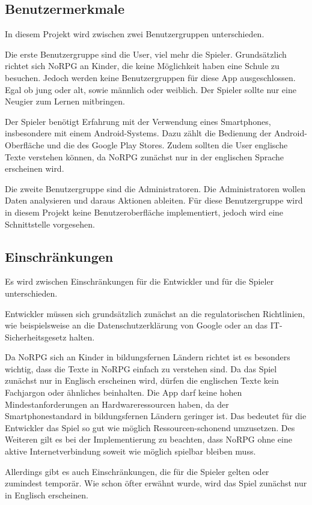 	\subsection{Benutzermerkmale}
		In diesem Projekt wird zwischen zwei Benutzergruppen unterschieden.
		
		Die erste Benutzergruppe sind die User, viel mehr die Spieler. Grundsätzlich richtet sich NoRPG an Kinder, die keine Möglichkeit haben eine Schule zu besuchen. Jedoch werden keine Benutzergruppen für diese App ausgeschlossen. Egal ob jung oder alt, sowie männlich oder weiblich. Der Spieler sollte nur eine Neugier zum Lernen mitbringen. 
		
		Der Spieler benötigt Erfahrung mit der Verwendung eines Smartphones, insbesondere mit einem Android-Systems. Dazu zählt die Bedienung der Android-Oberfläche und die des Google Play Stores. Zudem sollten die User englische Texte verstehen können, da NoRPG zunächst nur in der englischen Sprache erscheinen wird.
		
		Die zweite Benutzergruppe sind die Administratoren.	Die Administratoren wollen Daten analysieren und daraus Aktionen ableiten. Für diese Benutzergruppe wird in diesem Projekt keine Benutzeroberfläche implementiert, jedoch wird eine Schnittstelle vorgesehen. 
			
	\subsection{Einschränkungen}
		Es wird zwischen Einschränkungen für die Entwickler und für die Spieler unterschieden.
		
		Entwickler müssen sich grundsätzlich zunächst an die regulatorischen Richtlinien, wie beispielsweise an die Datenschutzerklärung von Google oder an das IT-Sicherheitsgesetz halten.
		
		Da NoRPG sich an Kinder in bildungsfernen Ländern richtet ist es besonders wichtig, dass die Texte in NoRPG einfach zu verstehen sind. Da das Spiel zunächst nur in Englisch erscheinen wird, dürfen die englischen Texte kein Fachjargon oder ähnliches beinhalten. Die App darf keine hohen Mindestanforderungen an Hardwareressourcen haben, da der Smartphonestandard in bildungsfernen Ländern geringer ist. Das bedeutet für die Entwickler das Spiel so gut wie möglich Ressourcen-schonend umzusetzen. Des Weiteren gilt es bei der Implementierung zu beachten, dass NoRPG ohne eine aktive Internetverbindung soweit wie möglich spielbar bleiben muss.
		
		Allerdings gibt es auch Einschränkungen, die für die Spieler gelten oder zumindest temporär. Wie schon öfter erwähnt wurde, wird das Spiel zunächst nur in Englisch erscheinen. 
		
